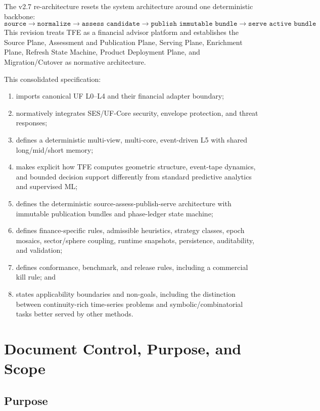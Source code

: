 The v2.7 re-architecture resets the system architecture around one deterministic backbone:
\[
\texttt{source} \rightarrow \texttt{normalize} \rightarrow \texttt{assess candidate} \rightarrow \texttt{publish immutable bundle} \rightarrow \texttt{serve active bundle}
\]
This revision treats TFE as a financial advisor platform and establishes the Source Plane, Assessment and Publication Plane, Serving Plane, Enrichment Plane, Refresh State Machine, Product Deployment Plane, and Migration/Cutover as normative architecture.

This consolidated specification:
\begin{enumerate}[leftmargin=1.2cm]
    \item imports canonical UF L0--L4 and their financial adapter boundary;
    \item normatively integrates SES/UF-Core security, envelope protection, and threat responses;
    \item defines a deterministic multi-view, multi-core, event-driven L5 with shared long/mid/short memory;
    \item makes explicit how TFE computes geometric structure, event-tape dynamics, and bounded decision support differently from standard predictive analytics and supervised ML;
    \item defines the deterministic source-assess-publish-serve architecture with immutable publication bundles and phase-ledger state machine;
    \item defines finance-specific rules, admissible heuristics, strategy classes, epoch mosaics, sector/sphere coupling, runtime snapshots, persistence, auditability, and validation;
    \item defines conformance, benchmark, and release rules, including a commercial kill rule; and
    \item states applicability boundaries and non-goals, including the distinction between continuity-rich time-series problems and symbolic/combinatorial tasks better served by other methods.
\end{enumerate}

\chapter{Document Control, Purpose, and Scope}
\section{Purpose}

